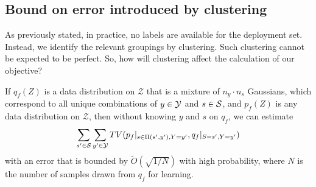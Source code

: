 \subsection{Bound on error introduced by clustering}\label{bound-on-error-introduced-by-clustering}
%
As previously stated, in practice, no labels are available for the deployment set.
Instead, we identify the relevant groupings by clustering.
Such clustering cannot be expected to be perfect.
So, how will clustering affect the calculation of our objective?

\begin{theorem}
If \(q_f(Z)\) is a data distribution on \(\mathcal{Z}\) that is a mixture of \(n_y\cdot n_s\)
Gaussians, which correspond to all unique combinations of \(y\in{\mathcal{Y}}\) and \(s\in{\mathcal{S}}\), and
\(p_f(Z)\) is any data distribution on \(\mathcal{Z}\), then without knowing \(y\) and \(s\) on
\(q_f\), we can estimate
%
\begin{align}
\sum\limits_{s'\in{\mathcal{S}}}\sum\limits_{y'\in{\mathcal{Y}}} TV(p_f|_{s\in \Pi(s',y'),Y=y'}, q_f|_{S=s',Y=y'})
\end{align}
%
with an error that is bounded by \(\tilde{O}(\sqrt{1/N})\) with high probability, where \(N\) is
the number of samples drawn from \(q_f\) for learning.
%
\end{theorem}

